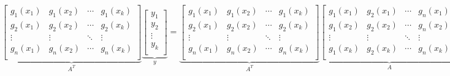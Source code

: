 \documentclass{article}
\begin{document}
                \[
                    \underbrace{
                    \begin{bmatrix}
                        g_{1}(x_{1}) & g_{1}(x_{2}) & \cdots & g_{1}(x_{k})\\
                        g_{2}(x_{1}) & g_{2}(x_{2}) & \cdots & g_{2}(x_{k})\\
                        \vdots       & \vdots       & \ddots & \vdots\\
                        g_{n}(x_{1}) & g_{n}(x_{2}) & \cdots & g_{n}(x_{k})\\
                    \end{bmatrix}}_{A^{T}}
                    \underbrace{
                    \begin{bmatrix}
                        y_{1}\\ y_{2}\\ \vdots\\ y_{k}\\
                    \end{bmatrix}}_{y} =
                    \underbrace{
                    \begin{bmatrix}
                        g_{1}(x_{1}) & g_{1}(x_{2}) & \cdots & g_{1}(x_{k})\\
                        g_{2}(x_{1}) & g_{2}(x_{2}) & \cdots & g_{2}(x_{k})\\
                        \vdots       & \vdots       & \ddots & \vdots\\
                        g_{n}(x_{1}) & g_{n}(x_{2}) & \cdots & g_{n}(x_{k})\\
                    \end{bmatrix}}_{A^{T}}
                    \underbrace{
                    \begin{bmatrix}
                        g_{1}(x_{1}) & g_{2}(x_{1}) & \cdots & g_{n}(x_{1})\\
                        g_{1}(x_{2}) & g_{2}(x_{2}) & \cdots & g_{n}(x_{2})\\
                        \vdots       & \vdots       & \ddots & \vdots\\
                        g_{1}(x_{k}) & g_{2}(x_{k}) & \cdots & g_{n}(x_{k})\\
                    \end{bmatrix}}_{A}
                    \underbrace{
                    \begin{bmatrix}
                        \alpha_{1}\\ \alpha_{2}\\ \vdots\\ \alpha_{n}\\
                    \end{bmatrix}}_{\alpha}
                \]
\end{document}
